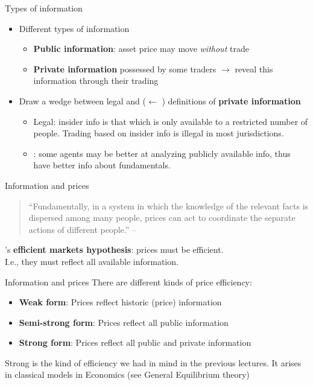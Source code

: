 \documentclass[english,10pt
,aspectratio=169
]{beamer}
\begin{document}
\begin{frame}{Types of information}
	\begin{itemize}
		\item Different types of information
		\begin{itemize}
			\item \textbf{Public information}:  asset price may move \textit{without} trade
			\item \textbf{Private information} possessed by some traders  $\rightarrow$ reveal this information through their trading
		\end{itemize}
		\pause
		\item Draw a wedge between \alert{legal} and  ($\leftarrow$ ) definitions of \textbf{private information}
		\begin{itemize}
			\item \alert{Legal}: insider info is that which is only available to a restricted number of people. Trading based on insider info is illegal in most jurisdictions.
			\item {}: some agents may be better at analyzing publicly available info, thus have better info about fundamentals.
		\end{itemize}
	\end{itemize}
\end{frame}


\begin{frame}{Information and prices}
	\begin{quotation}
		``Fundamentally, in a system in which the knowledge of the relevant facts is dispersed among many people, prices can act to coordinate the separate actions of different people.'' -- 
	\end{quotation}

	's \textbf{efficient markets hypothesis}: {prices} must be {efficient}.
	\\
	I.e., they must reflect all available information.
\end{frame}


%	


\begin{frame}{Information and prices}
	There are different kinds of price efficiency:
	\begin{itemize}
		\item \textbf{Weak form}: Prices reflect historic (price) information
		\item \textbf{Semi-strong form}: Prices reflect all public information
		\item \textbf{Strong form}: Prices reflect all public and private information
	\end{itemize}
	Strong is the kind of efficiency we had in mind in the previous lectures. It arises in classical models in Economics (see General Equilibrium theory)
\end{frame}
\end{document}
